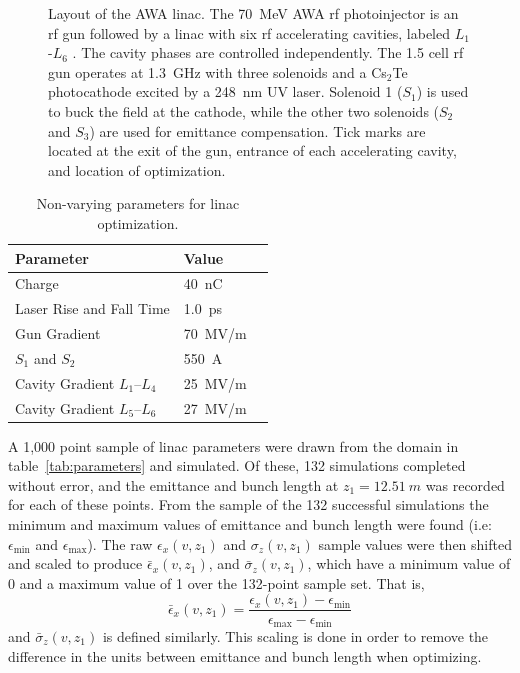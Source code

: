 \begin{figure}
\begin{center}
	\end{center}
	\caption{Layout of the AWA linac. The \SI{70}{MeV} AWA rf photoinjector 
		is an rf gun followed by a linac with six rf accelerating cavities, 
		labeled $L_1$-$L_6$ \cite{Power:2010zza}.  The cavity phases are controlled independently. 
		The 1.5 cell rf gun operates at \SI{1.3}{GHz} with three solenoids 
		and a Cs$_{2}$Te photocathode excited by a \SI{248}{nm} UV laser.  
		Solenoid 1 ($S_1$) is used to buck the field at the cathode,
		while the other two solenoids ($S_2$ and $S_3$) are used for emittance compensation.  
		Tick marks are located at the exit of the gun, entrance of
		each accelerating cavity, and location of optimization.}
	\label{fig:beamline} 
\end{figure} 
\begin{table}%
	\caption{\label{tab:linac} Non-varying parameters for linac optimization.}
	\begin{center}
		\begin{tabular}{lll}
			\toprule
			\toprule
			\textbf{Parameter} & \textbf{Value} \\
			\midrule
			Charge  & \SI{40}{nC} \\
			Laser Rise and Fall Time & \SI{1.0}{ps} \\
			Gun Gradient & \SI{70}{MV/m} \\
			$S_1$ and $S_2$ & \SI{550}{A}\\
			Cavity Gradient $L_1$--$L_4$ & \SI{25}{MV/m} \\
			Cavity Gradient $L_5$--$L_6$ & \SI{27}{MV/m} \\
			\bottomrule
		\end{tabular}
	\end{center}
\end{table}

A 1,000 point sample of linac parameters were drawn from the domain
in table~\ref{tab:parameters} and simulated. Of these, 132 simulations completed
without error, and the emittance and bunch length at $z_1=\SI{12.51}{m}$ was
recorded for each of these points. From the sample of the 132 successful simulations 
the minimum and maximum values of emittance and bunch length
were found (i.e: $\epsilon_{\min}$ and $\epsilon_{\max}$). 
The raw $\epsilon_x(v,z_1)$ and $\sigma_z(v,z_1)$ sample values were then
shifted and scaled to produce $\bar{\epsilon}_x(v,z_1)$, and $\bar{\sigma}_z(v,z_1)$,
which have a minimum value of 0 and a maximum value of 1 over the 132-point sample set. That is, 
\begin{equation}
\bar{\epsilon}_x (v,z_1) = \frac{ \epsilon_x (v,z_1) - \epsilon_{\min} } { \epsilon_{\max} - \epsilon_{\min} }
\label{eq:scale}
\end{equation} 
and $\bar{\sigma}_z (v,z_1)$ is defined similarly.
This scaling is done in order to remove the difference in the units between
emittance and bunch length when optimizing.

